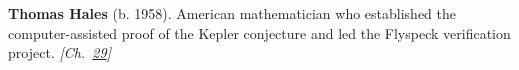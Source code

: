 \textbf{Thomas Hales} (b. 1958). American mathematician who established the computer-assisted proof of the Kepler conjecture and led the Flyspeck verification project. \emph{[Ch.~\hyperref[ch:hatmonotile]{29}]}

